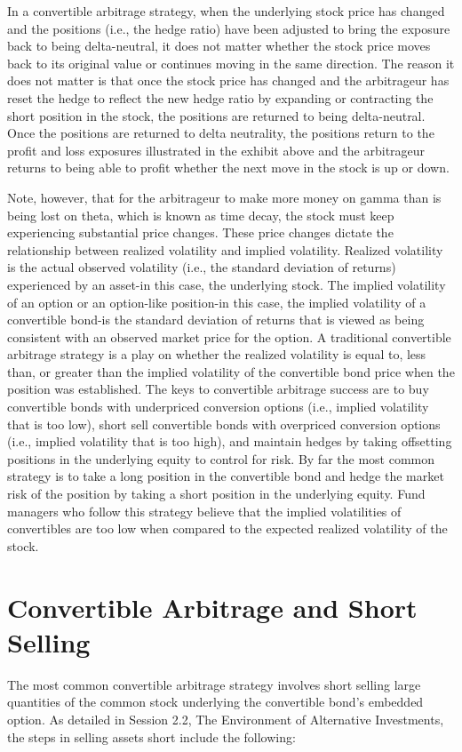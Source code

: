 \documentclass[11pt]{article}
\begin{document}
In a convertible arbitrage strategy, when the underlying stock price has changed and the positions (i.e., the hedge ratio) have been adjusted to bring the exposure back to being delta-neutral, it does not matter whether the stock price moves back to its original value or continues moving in the same direction. The reason it does not matter is that once the stock price has changed and the arbitrageur has reset the hedge to reflect the new hedge ratio by expanding or contracting the short position in the stock, the positions are returned to being delta-neutral. Once the positions are returned to delta neutrality, the positions return to the profit and loss exposures illustrated in the exhibit above and the arbitrageur returns to being able to profit whether the next move in the stock is up or down.

Note, however, that for the arbitrageur to make more money on gamma than is being lost on theta, which is known as time decay, the stock must keep experiencing substantial price changes. These price changes dictate the relationship between realized volatility and implied volatility. Realized volatility is the actual observed volatility (i.e., the standard deviation of returns) experienced by an asset-in this case, the underlying stock. The implied volatility of an option or an option-like position-in this case, the implied volatility of a convertible bond-is the standard deviation of returns that is viewed as being consistent with an observed market price for the option. A traditional convertible arbitrage strategy is a play on whether the realized volatility is equal to, less than, or greater than the implied volatility of the convertible bond price when the position was established. The keys to convertible arbitrage success are to buy convertible bonds with underpriced conversion options (i.e., implied volatility that is too low), short sell convertible bonds with overpriced conversion options (i.e., implied volatility that is too high), and maintain hedges by taking offsetting positions in the underlying equity to control for risk. By far the most common strategy is to take a long position in the convertible bond and hedge the market risk of the position by taking a short position in the underlying equity. Fund managers who follow this strategy believe that the implied volatilities of convertibles are too low when compared to the expected realized volatility of the stock.

\section*{Convertible Arbitrage and Short Selling}
The most common convertible arbitrage strategy involves short selling large quantities of the common stock underlying the convertible bond's embedded option. As detailed in Session 2.2, The Environment of Alternative Investments, the steps in selling assets short include the following:
\end{document}
